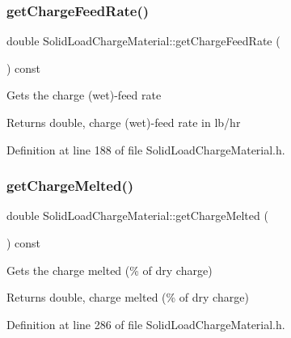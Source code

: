 \subsubsection{\texorpdfstring{get\+Charge\+Feed\+Rate()}{getChargeFeedRate()}\hspace{0.1cm}{\footnotesize\ttfamily [3/3]}}
{\footnotesize\ttfamily double Solid\+Load\+Charge\+Material\+::get\+Charge\+Feed\+Rate (\begin{DoxyParamCaption}{ }\end{DoxyParamCaption}) const\hspace{0.3cm}{\ttfamily [inline]}}

Gets the charge (wet)-\/feed rate \begin{DoxyReturn}{Returns}
double, charge (wet)-\/feed rate in lb/hr 
\end{DoxyReturn}


Definition at line 188 of file Solid\+Load\+Charge\+Material.\+h.

\mbox{\label{class_solid_load_charge_material_ad9ab52fe5861f48b763fe300851df69a}} 
\subsubsection{\texorpdfstring{get\+Charge\+Melted()}{getChargeMelted()}\hspace{0.1cm}{\footnotesize\ttfamily [1/3]}}
{\footnotesize\ttfamily double Solid\+Load\+Charge\+Material\+::get\+Charge\+Melted (\begin{DoxyParamCaption}{ }\end{DoxyParamCaption}) const\hspace{0.3cm}{\ttfamily [inline]}}

Gets the charge melted (\% of dry charge) \begin{DoxyReturn}{Returns}
double, charge melted (\% of dry charge) 
\end{DoxyReturn}


Definition at line 286 of file Solid\+Load\+Charge\+Material.\+h.

\mbox{\label{class_solid_load_charge_material_ad9ab52fe5861f48b763fe300851df69a}} 

